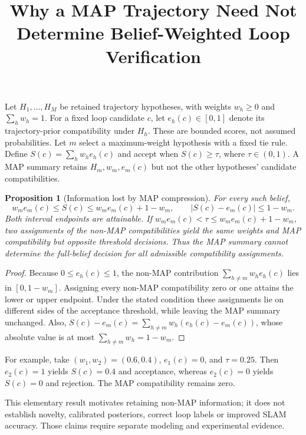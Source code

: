 \documentclass[11pt]{article}
\title{Why a MAP Trajectory Need Not Determine Belief-Weighted Loop Verification}
\author{}
\date{}
\newtheorem{proposition}{Proposition}
\begin{document}
\maketitle
Let $H_1,\ldots,H_M$ be retained trajectory hypotheses, with weights $w_h\geq0$
and $\sum_h w_h=1$. For a fixed loop candidate $c$, let $e_h(c)\in[0,1]$ denote
its trajectory-prior compatibility under $H_h$. These are bounded scores, not
assumed probabilities. Let $m$ select a maximum-weight hypothesis with a fixed
tie rule. Define $S(c)=\sum_h w_he_h(c)$ and accept when $S(c)\geq\tau$, where
$\tau\in(0,1)$. A MAP summary retains $H_m,w_m,e_m(c)$ but not the other
hypotheses' candidate compatibilities.
\begin{proposition}[Information lost by MAP compression]
For every such belief,
\[
 w_me_m(c)\leq S(c)\leq w_me_m(c)+1-w_m,
 \qquad |S(c)-e_m(c)|\leq1-w_m.
\]
Both interval endpoints are attainable. If
$w_me_m(c)<\tau\leq w_me_m(c)+1-w_m$, two assignments of the non-MAP
compatibilities yield the same weights and MAP compatibility but opposite
threshold decisions. Thus the MAP summary cannot determine the full-belief
decision for all admissible compatibility assignments.
\end{proposition}
\begin{proof}
Because $0\leq e_h(c)\leq1$, the non-MAP contribution
$\sum_{h\ne m}w_he_h(c)$ lies in $[0,1-w_m]$. Assigning every non-MAP
compatibility zero or one attains the lower or upper endpoint. Under the stated
condition these assignments lie on different sides of the acceptance threshold,
while leaving the MAP summary unchanged. Also,
$S(c)-e_m(c)=\sum_{h\ne m}w_h(e_h(c)-e_m(c))$, whose absolute value is at most
$\sum_{h\ne m}w_h=1-w_m$.
\end{proof}
For example, take $(w_1,w_2)=(0.6,0.4)$, $e_1(c)=0$, and $\tau=0.25$.
Then $e_2(c)=1$ yields $S(c)=0.4$ and acceptance, whereas $e_2(c)=0$ yields
$S(c)=0$ and rejection. The MAP compatibility remains zero.

This elementary result motivates retaining non-MAP information; it does not
establish novelty, calibrated posteriors, correct loop labels or improved SLAM
accuracy. Those claims require separate modeling and experimental evidence.
\end{document}

